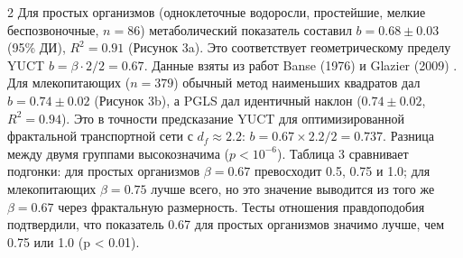 \documentclass[11pt,a4paper]{article}
\newcommand{\betaf}{\beta}
\newcommand{\df}{d_f}
\begin{document}
\begin{multicols}{2}
		Для простых организмов (одноклеточные водоросли, простейшие, мелкие беспозвоночные, \(n = 86\)) метаболический показатель составил \(b = 0.68 \pm 0.03\) (95\% ДИ), \(R^2 = 0.91\) (Рисунок 3a). Это соответствует геометрическому пределу YUCT \(b = \betaf \cdot 2/2 = 0.67\). Данные взяты из работ Banse (1976) \cite{Banse1976} и Glazier (2009) \cite{Glazier2009}. Для млекопитающих (\(n = 379\)) обычный метод наименьших квадратов дал \(b = 0.74 \pm 0.02\) (Рисунок 3b), а PGLS дал идентичный наклон (\(0.74 \pm 0.02\), \(R^2 = 0.94\)). Это в точности предсказание YUCT для оптимизированной фрактальной транспортной сети с \(\df \approx 2.2\): \(b = 0.67 \times 2.2 / 2 = 0.737\). Разница между двумя группами высокозначима (\(p < 10^{-6}\)). Таблица 3 сравнивает подгонки: для простых организмов \(\beta = 0.67\) превосходит 0.5, 0.75 и 1.0; для млекопитающих \(\beta = 0.75\) лучше всего, но это значение выводится из того же \(\beta = 0.67\) через фрактальную размерность. Тесты отношения правдоподобия подтвердили, что показатель 0.67 для простых организмов значимо лучше, чем 0.75 или 1.0 (p < 0.01).
		

\end{multicols}
\end{document}
